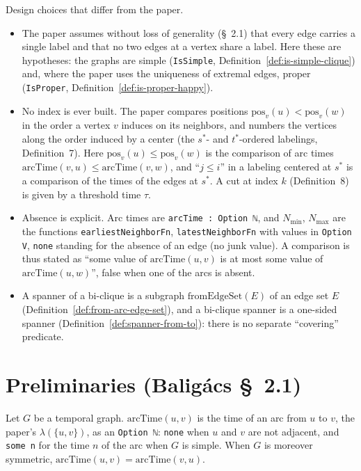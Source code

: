 Design choices that differ from the paper.
\begin{itemize}
\item
  The paper assumes without loss of generality (\S~2.1) that every edge
  carries a single label and that no two edges at a vertex share a label.
  Here these are hypotheses: the graphs are simple
  (\texttt{IsSimple}, Definition~\ref{def:is-simple-clique}) and, where the
  paper uses the uniqueness of extremal edges, proper
  (\texttt{IsProper}, Definition~\ref{def:is-proper-happy}).
\item
  No index is ever built. The paper compares positions
  $\mathrm{pos}_v(u) < \mathrm{pos}_v(w)$ in the order a vertex $v$ induces on
  its neighbors, and numbers the vertices along the order induced by a center
  (the $s^*$- and $t^*$-ordered labelings, Definition~7). Here
  $\mathrm{pos}_v(u) \le \mathrm{pos}_v(w)$ is the comparison of arc times
  $\mathrm{arcTime}(v, u) \le \mathrm{arcTime}(v, w)$, and ``$j \le i$'' in a
  labeling centered at $s^*$ is a comparison of the times of the edges at
  $s^*$. A cut at index $k$ (Definition~8) is given by a threshold time $\tau$.
\item
  Absence is explicit. Arc times are \texttt{arcTime : Option ℕ}, and $N_{\min}$,
  $N_{\max}$ are the functions \texttt{earliestNeighborFn},
  \texttt{latestNeighborFn} with values in \texttt{Option V}, \texttt{none}
  standing for the absence of an edge (no junk value). A comparison is thus
  stated as ``some value of $\mathrm{arcTime}(u, v)$ is at most some value of
  $\mathrm{arcTime}(u, w)$'', false when one of the arcs is absent.
\item
  A spanner of a bi-clique is a subgraph $\mathrm{fromEdgeSet}(E)$ of an edge
  set $E$ (Definition~\ref{def:from-arc-edge-set}), and a bi-clique spanner
  is a one-sided spanner (Definition~\ref{def:spanner-from-to}): there is no
  separate ``covering'' predicate.
\end{itemize}
\bigskip

\section*{Preliminaries (Baligács \S~2.1)}

\begin{definition}
  \label{def:arc-time}
  \leanok
  Let $G$ be a temporal graph. $\mathrm{arcTime}(u, v)$ is the time of an arc
  from $u$ to $v$, the paper's $\lambda(\{u, v\})$, as an
  \texttt{Option ℕ}: \texttt{none} when $u$ and $v$ are not adjacent, and
  \texttt{some n} for the time $n$ of the arc when $G$ is simple. When $G$ is
  moreover symmetric, $\mathrm{arcTime}(u, v) = \mathrm{arcTime}(v, u)$.
\end{definition}

